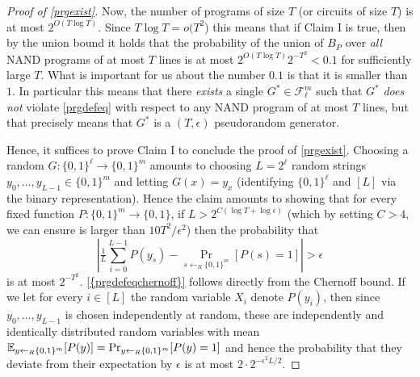 \begin{proof}[Proof of \cref{prgexist}]
Now, the number of programs of size \(T\) (or circuits of size \(T\)) is
at most \(2^{O(T\log T)}\). Since \(T\log T = o(T^2\)) this means that
if Claim I is true, then by the union bound it holds that the
probability of the union of \(B_P\) over \emph{all} NAND programs of at
most \(T\) lines is at most \(2^{O(T\log T)}2^{-T^2} < 0.1\) for
sufficiently large \(T\). What is important for us about the number
\(0.1\) is that it is smaller than \(1\). In particular this means that
there \emph{exists} a single \(G^* \in \mathcal{F}_\ell^m\) such that
\(G^*\) \emph{does not} violate \eqref{prgdefeq} with respect to any
NAND program of at most \(T\) lines, but that precisely means that
\(G^*\) is a \((T,\epsilon)\) pseudorandom generator.

Hence, it suffices to prove Claim I to conclude the proof of
\cref{prgexist}. Choosing a random
\(G: \{0,1\}^\ell \rightarrow \{0,1\}^m\) amounts to choosing
\(L=2^\ell\) random strings \(y_0,\ldots,y_{L-1} \in \{0,1\}^m\) and
letting \(G(x)=y_x\) (identifying \(\{0,1\}^\ell\) and \([L]\) via the
binary representation). Hence the claim amounts to showing that for
every fixed function \(P:\{0,1\}^m \rightarrow \{0,1\}\), if
\(L > 2^{C (\log T + \log \epsilon)}\) (which by setting \(C>4\), we can
ensure is larger than \(10 T^2/\epsilon^2\)) then the probability that
\[
\left| \tfrac{1}{L}\sum_{i=0}^{L-1} P(y_s) - \Pr_{s \leftarrow_R \{0,1\}^m}[P(s)=1] \right| > \epsilon \label{prgdefeqchernoff}
\] is at most \(2^{-T^2}\). \eqref{{prgdefeqchernoff}} follows directly
from the Chernoff bound. If we let for every \(i\in [L]\) the random
variable \(X_i\) denote \(P(y_i)\), then since \(y_0,\ldots,y_{L-1}\) is
chosen independently at random, these are independently and identically
distributed random variables with mean
\(\operatorname*{\mathbb E}_{y \leftarrow_R \{0,1\}^m}[P(y)]= \Pr_{y\leftarrow_R \{0,1\}^m}[ P(y)=1]\)
and hence the probability that they deviate from their expectation by
\(\epsilon\) is at most \(2\cdot 2^{-\epsilon^2 L/2}\).

\end{proof}

